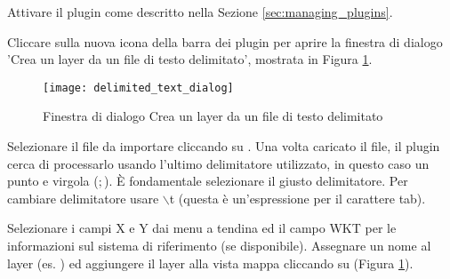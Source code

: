 Attivare il plugin come descritto nella Sezione \ref{sec:managing_plugins}.

Cliccare sulla nuova icona della barra dei plugin  
per aprire la finestra di dialogo 'Crea un layer da un file di testo delimitato', mostrata in Figura
\ref{fig:delim_text_plugin_dialog}.

\begin{figure}[ht]
   \centering
   \texttt{[image: delimited\_text\_dialog]}   
   \caption{Finestra di dialogo Crea un layer da un file di testo delimitato \nixcaption}\label{fig:delim_text_plugin_dialog}
\end{figure}

Selezionare il file  da importare cliccando su . 
Una volta caricato il file, il plugin cerca di processarlo usando l'ultimo delimitatore utilizzato, 
in questo caso un punto e virgola (\mbox{$;$}). È fondamentale selezionare il giusto delimitatore. 
Per cambiare delimitatore usare \mbox{$\backslash$}t (questa è un'espressione per il carattere tab).

Selezionare i campi X e Y dai menu a tendina ed il campo WKT per le informazioni sul sistema di riferimento 
(se disponibile). Assegnare un nome al layer (es. ) ed aggiungere il layer alla vista mappa 
cliccando su  (Figura \ref{fig:delim_text_plugin_dialog}).

\FloatBarrier
